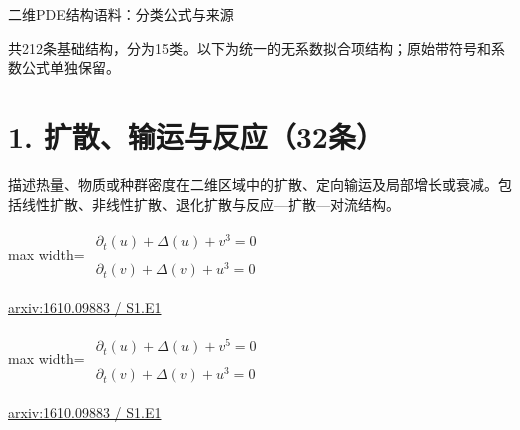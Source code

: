 \documentclass[UTF8,10pt,a4paper,fontset=mac]{ctexart}
\begin{document}
{\Large 二维PDE结构语料：分类公式与来源}\par
共212条基础结构，分为15类。以下为统一的无系数拟合项结构；原始带符号和系数公式单独保留。\par
\section*{1. 扩散、输运与反应（32条）}
描述热量、物质或种群密度在二维区域中的扩散、定向输运及局部增长或衰减。包括线性扩散、非线性扩散、退化扩散与反应—扩散—对流结构。\par\medskip

\begin{minipage}{\linewidth}\begin{center}\begin{adjustbox}{max width=\linewidth}$\displaystyle\begin{gathered}\begin{gathered}\partial_{t}(u)+\Delta(u)+v^{3}=0\end{gathered}\\[5pt]\begin{gathered}\partial_{t}(v)+\Delta(v)+u^{3}=0\end{gathered}\end{gathered}$\end{adjustbox}\end{center}{\small\href{https://arxiv.org/html/1610.09883#S1.E1}{arxiv:1610.09883 / S1.E1}}\par\end{minipage}\par\vspace{6mm}

\begin{minipage}{\linewidth}\begin{center}\begin{adjustbox}{max width=\linewidth}$\displaystyle\begin{gathered}\begin{gathered}\partial_{t}(u)+\Delta(u)+v^{5}=0\end{gathered}\\[5pt]\begin{gathered}\partial_{t}(v)+\Delta(v)+u^{3}=0\end{gathered}\end{gathered}$\end{adjustbox}\end{center}{\small\href{https://arxiv.org/html/1610.09883#S1.E1}{arxiv:1610.09883 / S1.E1}}\par\end{minipage}\par\vspace{6mm}
\end{document}
